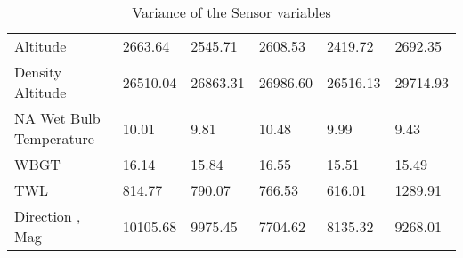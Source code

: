 \documentclass{article}
\begin{document}
\begin{table}[H]
{\begin{tabular}{l|lllll}
Altitude                     & 2663.64           & 2545.71           & 2608.53           & 2419.72           & 2692.35           \\
Density Altitude             & 26510.04          & 26863.31          & 26986.60          & 26516.13          & 29714.93          \\
NA Wet Bulb Temperature      & 10.01             & 9.81              & 10.48             & 9.99              & 9.43              \\
WBGT                         & 16.14             & 15.84             & 16.55             & 15.51             & 15.49             \\
TWL                          & 814.77            & 790.07            & 766.53            & 616.01            & 1289.91           \\
Direction ‚ Mag              & 10105.68          & 9975.45           & 7704.62           & 8135.32           & 9268.01          
\end{tabular}%
}
\caption{Variance of the Sensor variables}
\label{tab:my-table}
\end{table}
\end{document}

